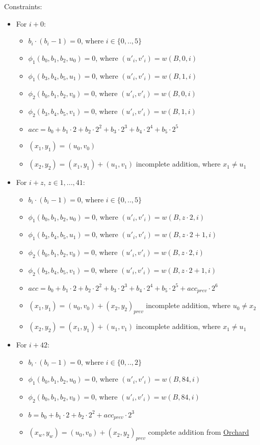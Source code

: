 Constraints:
\begin{itemize}
	\item For $i + 0$:
	\begin{itemize}
		\item $b_i \cdot (b_i - 1) = 0$, where $i \in\{0,.., 5\}$ 
		\item $\phi_1(b_0, b_1, b_2, u_0) = 0$, where $(u'_{i}, v'_{i}) = w(B, 0, i)$
		\item $\phi_1(b_3, b_4, b_5, u_1) = 0$, where $(u'_{i}, v'_{i}) = w(B, 1, i)$
		\item $\phi_2(b_0, b_1, b_2, v_0) = 0$, where $(u'_{i}, v'_{i}) = w(B, 0, i)$
		\item $\phi_2(b_3, b_4, b_5, v_1) = 0$, where $(u'_{i}, v'_{i}) = w(B, 1, i)$
		\item $acc = b_0 + b_1 \cdot 2 + b_2 \cdot 2^2 + b_3 \cdot 2^3 + b_4 \cdot 2^4 + b_5 \cdot 2^5 $
		\item $(x_1, y_1) = (u_0, v_0)$
		\item $(x_2, y_2) = (x_1, y_1) + (u_1, v_1)$ incomplete addition, where $x_1 \neq u_1$
	\end{itemize}
	\item For $i + z$, $z \in{1, ..., 41}$:
		\begin{itemize}
		\item $b_i \cdot (b_i - 1) = 0$, where $i \in\{0,.., 5\}$ 
		\item $\phi_1(b_0, b_1, b_2, u_0) = 0$, where $(u'_{i}, v'_{i}) = w(B, z \cdot 2, i)$
		\item $\phi_1(b_3, b_4, b_5, u_1) = 0$, where $(u'_{i}, v'_{i}) = w(B, z \cdot 2 + 1, i)$
		\item $\phi_2(b_0, b_1, b_2, v_0) = 0$, where $(u'_{i}, v'_{i}) = w(B, z \cdot 2, i)$
		\item $\phi_2(b_3, b_4, b_5, v_1) = 0$, where $(u'_{i}, v'_{i}) = w(B, z \cdot 2 + 1, i)$
		\item $acc = b_0 + b_1 \cdot 2 + b_2 \cdot 2^2 + b_3 \cdot 2^3 + b_4 \cdot 2^4 + b_5 \cdot 2^5 + acc_{prev} \cdot 2^6$
		\item $(x_1, y_1) = (u_0, v_0) + (x_2, y_2)_{prev}$  incomplete addition, where $u_0 \neq x_2$
		\item $(x_2, y_2) = (x_1, y_1) + (u_1, v_1)$ incomplete addition, where $x_1 \neq u_1$
	\end{itemize}
	\item For $i + 42$:
		\begin{itemize}
		\item $b_i \cdot (b_i - 1) = 0$, where $i \in\{0,.., 2\}$ 
		\item $\phi_1(b_0, b_1, b_2, u_0) = 0$, where $(u'_{i}, v'_{i}) = w(B, 84, i)$
		\item $\phi_2(b_0, b_1, b_2, v_0) = 0$, where $(u'_{i}, v'_{i}) = w(B, 84, i)$
		\item $b = b_0 + b_1 \cdot 2 + b_2 \cdot 2^2 + acc_{prev} \cdot 2^3$
		\item $(x_w, y_w) = (u_0, v_0) + (x_2, y_2)_{prev}$  complete addition from \href{https://zcash.github.io/orchard/design/circuit/gadgets/ecc/addition.html} {Orchard}
	\end{itemize}
\end{itemize}